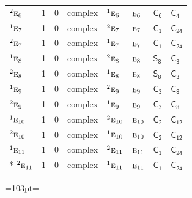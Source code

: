 \documentclass[10pt,a4paper]{article}
\newcommand{\needspace}[1]{\par\penalty-100\begingroup\dimen0=#1\relax\dimen2=\pagegoal
  \advance\dimen2-\pagetotal\ifdim\dimen0>\dimen2\relax\ifdim\dimen2>0pt\vfil\break\fi\fi
  \endgroup}
\numberwithin{equation}{section}
\newcommand{\grp}[1]{\mathsf{#1}}
\newcommand{\irr}[1]{\text{\normalfont\scshape #1}}
\newcommand{\conjpair}[1]{{}^{#1}}
\begin{document}
{\begin{longtable}{@{}lrrlllll@{}}
$\conjpair{2}\irr{e}_{6}$ & 1 & $0$ & complex & $\conjpair{1}\irr{e}_{6}$ & $\irr{e}_{6}$ & \href{C6.pdf}{$\grp{C_{6}}$} & \href{C4.pdf}{$\grp{C_{4}}$}\\
$\conjpair{1}\irr{e}_{7}$ & 1 & $0$ & complex & $\conjpair{2}\irr{e}_{7}$ & $\irr{e}_{7}$ & \href{C1.pdf}{$\grp{C_{1}}$} & $\grp{C_{24}}$\\
$\conjpair{2}\irr{e}_{7}$ & 1 & $0$ & complex & $\conjpair{1}\irr{e}_{7}$ & $\irr{e}_{7}$ & \href{C1.pdf}{$\grp{C_{1}}$} & $\grp{C_{24}}$\\
$\conjpair{1}\irr{e}_{8}$ & 1 & $0$ & complex & $\conjpair{2}\irr{e}_{8}$ & $\irr{e}_{8}$ & \href{S8.pdf}{$\grp{S_{8}}$} & \href{C3.pdf}{$\grp{C_{3}}$}\\
$\conjpair{2}\irr{e}_{8}$ & 1 & $0$ & complex & $\conjpair{1}\irr{e}_{8}$ & $\irr{e}_{8}$ & \href{S8.pdf}{$\grp{S_{8}}$} & \href{C3.pdf}{$\grp{C_{3}}$}\\
$\conjpair{1}\irr{e}_{9}$ & 1 & $0$ & complex & $\conjpair{2}\irr{e}_{9}$ & $\irr{e}_{9}$ & \href{C3.pdf}{$\grp{C_{3}}$} & \href{C8.pdf}{$\grp{C_{8}}$}\\
$\conjpair{2}\irr{e}_{9}$ & 1 & $0$ & complex & $\conjpair{1}\irr{e}_{9}$ & $\irr{e}_{9}$ & \href{C3.pdf}{$\grp{C_{3}}$} & \href{C8.pdf}{$\grp{C_{8}}$}\\
$\conjpair{1}\irr{e}_{10}$ & 1 & $0$ & complex & $\conjpair{2}\irr{e}_{10}$ & $\irr{e}_{10}$ & \href{C2.pdf}{$\grp{C_{2}}$} & \href{C12.pdf}{$\grp{C_{12}}$}\\
$\conjpair{2}\irr{e}_{10}$ & 1 & $0$ & complex & $\conjpair{1}\irr{e}_{10}$ & $\irr{e}_{10}$ & \href{C2.pdf}{$\grp{C_{2}}$} & \href{C12.pdf}{$\grp{C_{12}}$}\\
$\conjpair{1}\irr{e}_{11}$ & 1 & $0$ & complex & $\conjpair{2}\irr{e}_{11}$ & $\irr{e}_{11}$ & \href{C1.pdf}{$\grp{C_{1}}$} & $\grp{C_{24}}$\\*
$\conjpair{2}\irr{e}_{11}$ & 1 & $0$ & complex & $\conjpair{1}\irr{e}_{11}$ & $\irr{e}_{11}$ & \href{C1.pdf}{$\grp{C_{1}}$} & $\grp{C_{24}}$\\
\bottomrule\end{longtable}}
\needspace{103pt}
\end{document}
